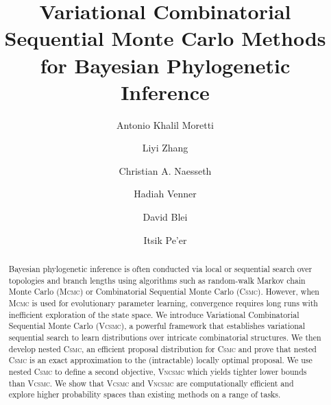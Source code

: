 \documentclass[accepted]{uai2021} %
\title{Variational Combinatorial Sequential Monte Carlo Methods for Bayesian Phylogenetic Inference}
\author[1,*]{
{Antonio Khalil Moretti}{}} %
\author[1,*]{Liyi Zhang}
\author[1]{Christian A. Naesseth}
\author[1]{Hadiah Venner}
\author[1]{David Blei}
\author[1]{Itsik Pe'er}
\affil[ ]{%
    Columbia University %
}
\affil[ ]{%
$\{$amoretti, itsik$\}$@cs.columbia.edu\\
$\{$lz2574, christian.a.naesseth, hkv2001, david.blei$\}$@columbia.edu
}
\theoremstyle{definition}
\begin{document}
\maketitle

\begin{abstract}
Bayesian phylogenetic inference is often conducted via local or sequential search over topologies and branch lengths using algorithms such as random-walk Markov chain Monte Carlo (\textsc{Mcmc}) or Combinatorial Sequential Monte Carlo (\textsc{Csmc}). %
However, when \textsc{Mcmc} is used for evolutionary parameter learning, convergence requires long runs with inefficient exploration of the state space. We introduce Variational Combinatorial Sequential Monte Carlo (\textsc{Vcsmc}), %
a powerful framework that establishes 
variational sequential search to learn distributions over intricate combinatorial structures.
We then develop nested \textsc{Csmc}, an efficient proposal distribution for \textsc{Csmc} and prove that nested \textsc{Csmc} is an exact approximation to the (intractable) locally optimal proposal. We use nested \textsc{Csmc} to define a second objective, \textsc{Vncsmc} which yields tighter lower bounds than \textsc{Vcsmc}. %
We show that \textsc{Vcsmc} and \textsc{Vncsmc} are computationally efficient and 
explore higher probability spaces than existing methods on a range of tasks.
\end{abstract}
\end{document}
